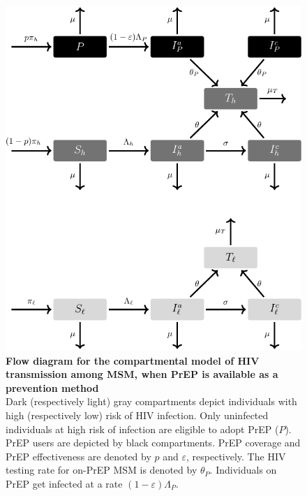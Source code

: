 \documentclass[11pt]{article}
\begin{document}
\newpage
\begin{figure}[H]
	\centering
	\includegraphics[width=12 cm]{Figures/Fig_S2}
	\caption[Flow diagram for the compartmental model of HIV transmission among MSM, when PrEP is available as a prevention method]{%
		{\bf Flow diagram for the compartmental model of HIV transmission among MSM, when PrEP is available as a prevention method}\\
	Dark (respectively light) gray compartments depict individuals with high (respectively low) risk of HIV infection. Only uninfected individuals at high risk of infection are eligible to adopt PrEP ($P$). PrEP users are depicted by black compartments. PrEP coverage and PrEP effectiveness are denoted by $p$ and $\varepsilon$, respectively. The HIV testing rate for on-PrEP MSM is denoted by $\theta_P$. Individuals on PrEP get infected at a rate $(1-\varepsilon) \Lambda_P$.}
	\label{fig:FlowDiagP}
\end{figure}
 
\end{document}
